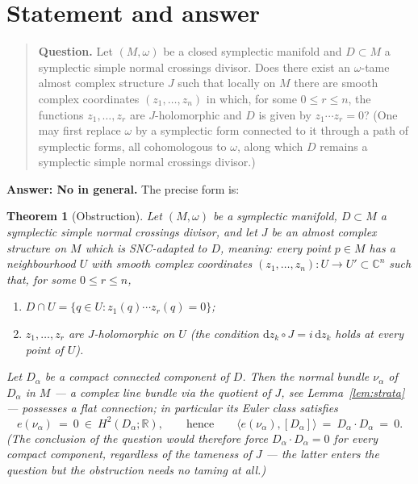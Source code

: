 \documentclass[11pt]{article}
\newtheorem{theorem}{Theorem}[section]
\theoremstyle{definition}
\theoremstyle{remark}
\newcommand{\CC}{\mathbb{C}}
\newcommand{\RR}{\mathbb{R}}
\newcommand{\dd}{\mathrm{d}}
\begin{document}
\section{Statement and answer}\label{sec:statement}

\begin{quote}
\textbf{Question.} Let $(M,\omega)$ be a closed symplectic manifold
and $D\subset M$ a symplectic simple normal crossings divisor. Does
there exist an $\omega$-tame almost complex structure $J$ such that
locally on $M$ there are smooth complex coordinates $(z_1,\ldots,z_n)$
in which, for some $0\le r\le n$, the functions $z_1,\ldots,z_r$ are
$J$-holomorphic and $D$ is given by $z_1\cdots z_r=0$? (One may first
replace $\omega$ by a symplectic form connected to it through a path
of symplectic forms, all cohomologous to $\omega$, along which $D$
remains a symplectic simple normal crossings divisor.)
\end{quote}

\medskip
\noindent\textbf{Answer: No in general.} 
The precise form is:

\begin{theorem}[Obstruction]\label{thm:obstruction}
Let $(M,\omega)$ be a symplectic manifold, $D\subset M$ a symplectic
simple normal crossings divisor, and let $J$ be an almost complex
structure on $M$ which is \emph{SNC-adapted to} $D$, meaning: every
point $p\in M$ has a neighbourhood $U$ with smooth complex
coordinates $(z_1,\ldots,z_n)\colon U\to U'\subset\CC^n$ such that,
for some $0\le r\le n$,
\begin{enumerate}
\item[\normalfont(i)] $D\cap U=\{q\in U:z_1(q)\cdots z_r(q)=0\}$;
\item[\normalfont(ii)] $z_1,\dots,z_r$ are $J$-holomorphic on $U$
(the condition $\dd z_k\circ J=i\,\dd z_k$ holds at every point of
$U$).
\end{enumerate}
Let $D_\alpha$ be a compact connected component of $D$. Then the
normal bundle $\nu_\alpha$ of $D_\alpha$ in $M$ --- a complex line
bundle via the quotient of $J$, see Lemma~\ref{lem:strata} ---
possesses a flat connection; in particular its Euler class satisfies
\[
e(\nu_\alpha)\ =\ 0\ \in\ H^2(D_\alpha;\RR),
\qquad\text{hence}\qquad
\langle e(\nu_\alpha),[D_\alpha]\rangle
\ =\ D_\alpha\cdot D_\alpha\ =\ 0 .
\]
(The conclusion of the question would therefore force
$D_\alpha\cdot D_\alpha=0$ for every compact component, regardless
of the tameness of $J$ --- the latter enters the question but the
obstruction needs no taming at all.)
\end{theorem}
\end{document}

